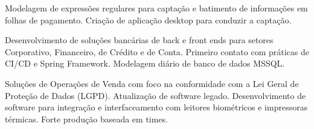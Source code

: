 \documentclass[10pt,a4paper,ragged2e]{altacv}
\begin{document}

\begin{fullwidth}
\makecvheader
\end{fullwidth}



Modelagem de expressões regulares para captação e batimento de informações em folhas de pagamento. Criação de aplicação desktop para conduzir a captação.


\divider

Desenvolvimento de soluções bancárias de back e front ends para setores Corporativo, Financeiro, de Crédito e de Conta. Primeiro contato com práticas de CI/CD e Spring Framework. Modelagem diário de banco de dados MSSQL.

\medskip
{}

\divider

Soluções de Operações de Venda com foco na conformidade com a Lei Geral de Proteção de Dados (LGPD). Atualização de software legado. Desenvolvimento de software para integração e interfaceamento com leitores biométricos e impressoras térmicas. Forte produção baseada em times. 
\end{document}
